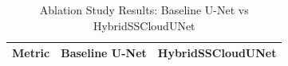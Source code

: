 \begin{table}[h]
\centering
\caption{Ablation Study Results: Baseline U-Net vs HybridSSCloudUNet}
\label{tab:ablation_results}
\begin{tabular}{lcc}
\toprule
Metric & Baseline U-Net & HybridSSCloudUNet \\
\midrule
\bottomrule
\end{tabular}
\end{table}
